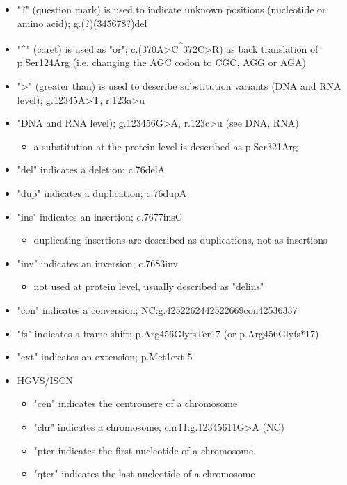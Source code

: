 \documentclass[12pt]{scrartcl}
\begin{document}
\begin{itemize}
\begin{itemize}
\begin{itemize}
\end{itemize}
\item "?" (question mark) is used to indicate unknown positions (nucleotide or amino acid); g.(?)\textunderscore(345678\textunderscore?)del
\item "\^{}" (caret) is used as "or"; c.(370A>C\textsuperscript{\^{}}372C>R) as back translation of p.Ser124Arg (i.e. changing the AGC codon to CGC, AGG or AGA)
\item ">" (greater than) is used to describe substitution variants (DNA
and RNA level); g.12345A>T, r.123a>u
\item "DNA and RNA level); g.123456G>A, r.123c>u (see DNA, RNA)
\begin{itemize}
\item a substitution at the protein level is described as p.Ser321Arg
\end{itemize}
\item "del" indicates a deletion; c.76delA
\item "dup" indicates a duplication; c.76dupA
\item "ins" indicates an insertion; c.76\textunderscore77insG
\begin{itemize}
\item duplicating insertions are described as duplications, not as insertions
\end{itemize}
\item "inv" indicates an inversion; c.76\textunderscore83inv
\begin{itemize}
\item not used at protein level, usually described as "delins"
\end{itemize}
\item "con" indicates a conversion; NC:g.42522624\textunderscore42522669con42536337
\item "fs" indicates a frame shift; p.Arg456GlyfsTer17 (or p.Arg456Glyfs*17)
\item "ext" indicates an extension; p.Met1ext-5
\item HGVS/ISCN 
\begin{itemize}
\item "cen" indicates the centromere of a chromosome
\item "chr" indicates a chromosome; chr11:g.12345611G>A (NC)
\item "pter indicates the first nucleotide of a chromosome
\item "qter" indicates the last nucleotide of a chromosome

\end{itemize}
\end{itemize}
\end{itemize}
\end{document}
